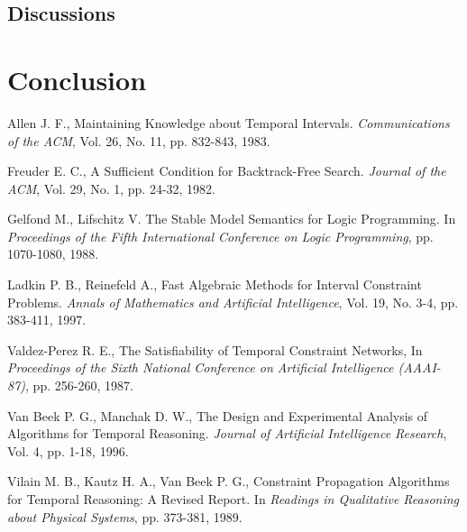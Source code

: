 \documentclass[11pt]{report}
\begin{document}
    \section{Discussions} 

  \chapter{Conclusion}

  \begin{thebibliography}{M}
      Allen J. F.,
      Maintaining Knowledge about Temporal Intervals.
      {\em Communications of the ACM},
      Vol. 26, No. 11, pp. 832-843,
      1983.

      Freuder E. C.,
      A Sufficient Condition for Backtrack-Free Search.
      {\em Journal of the ACM},
      Vol. 29, No. 1, pp. 24-32,
      1982.

      Gelfond M., Lifschitz V.
      The Stable Model Semantics for Logic Programming.
      In {\em Proceedings of the Fifth International Conference on Logic Programming},
      pp. 1070-1080,
      1988.

      Ladkin P. B., Reinefeld A.,
      Fast Algebraic Methods for Interval Constraint Problems.
      {\em Annals of Mathematics and Artificial Intelligence},
      Vol. 19, No. 3-4, pp. 383-411,
      1997.

      Valdez-Perez R. E.,
      The Satisfiability of Temporal Constraint Networks,
      In {\em Proceedings of the Sixth National Conference on Artificial Intelligence (AAAI-87)},
      pp. 256-260,
      1987.

      Van Beek P. G., Manchak D. W.,
      The Design and Experimental Analysis of Algorithms for Temporal Reasoning.
      {\em Journal of Artificial Intelligence Research},
      Vol. 4, pp. 1-18,
      1996.

      Vilain M. B., Kautz H. A., Van Beek P. G.,
      Constraint Propagation Algorithms for Temporal Reasoning: A Revised Report.
      In {\em Readings in Qualitative Reasoning about Physical Systems},
      pp. 373-381,
      1989.
  \end{thebibliography}
\end{document}
